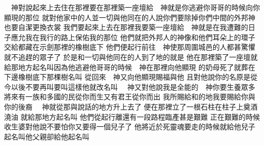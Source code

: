 \bchapter%
　神對說\chientien 起來\chientien 上去\chientien 住在那裡\chientien 要在那裡築一座壇給　神\chientien 就是你逃避你哥哥的時候向你顯現的那位\chuan 
{}就對他家中的人\chientien 並一切與他同在的人說\chientien 你們要除掉你們中間的外邦神\chientien 也要自潔\chientien 更換衣裳\chuan 
{}我們要起來\chientien 上去\yuentien 在那裡我要築一座壇給　神\chientien 就是在我遭難的日子\chientien 應允我\chientien 在我行的路上保佑我的那位\chuan 
{}他們就把外邦人的神像\chientien 和他們耳朵上的環子\chientien 交給\yuentien{}都藏在示劍那裡的橡樹底下\chuan 
{}他們便起行前往\yuentien 　神使那周圍城邑的人都甚驚懼\chientien 就不追趕的眾子了\chuan 
{}於是和一切與他同在的人\chientien 到了地的\chientien 就是\chuan 
{}他在那裡築了一座壇\chientien 就給那地方起名叫\chientien{}因為他逃避他哥哥的時候\chientien 　神在那裡向他顯現\chuan 
{}的奶母死了\chientien 就葬在下邊橡樹底下\yuentien 那棵樹名叫\chuan\Chuan
{}從回來\chientien 　神又向他顯現賜福與他\yuentien 
{}且對他說\chientien 你的名原是\chientien 從今以後不要再叫\chientien 要叫\chientien 這樣\chientien 他就改名叫\chuan 
{}　神又對他說\chientien 我是全能的　神\chientien 你要生養眾多\chientien 將來有一族\chientien 和多國的民從你而生\chientien 又有君王從你而出\chuan 
{}我所賜給和的地\chientien 我要賜給你\chientien 與你的後裔\chuan 
{}　神就從那與說話的地方升上去了\chuan 
{}便在那裡立了一根石柱\chientien 在柱子上奠酒\chientien 澆油\yuentien 
{}就給那地方起名叫\chuan\Chuan
{}他們從起行\chientien 離還有一段路程\chientien{}臨產甚是艱難\yuentien 
{}正在艱難的時候\chientien 收生婆對他說\chientien 不要怕\chientien 你又要得一個兒子了\chuan 
{}他將近於死\chientien 靈魂要走的時候\chientien 就給他兒子起名叫\chientien 他父親卻給他起名叫\chuan 

